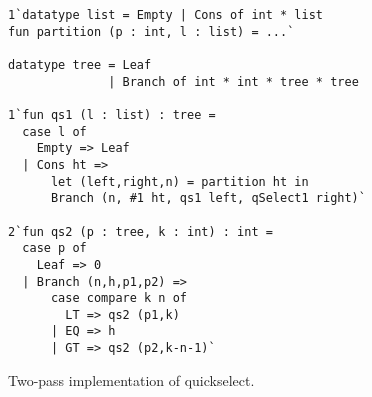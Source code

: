 \begin{figure}
\begin{lstlisting}
1`datatype list = Empty | Cons of int * list
fun partition (p : int, l : list) = ...`

datatype tree = Leaf
              | Branch of int * int * tree * tree

1`fun qs1 (l : list) : tree =
  case l of
    Empty => Leaf
  | Cons ht => 
      let (left,right,n) = partition ht in
      Branch (n, #1 ht, qs1 left, qSelect1 right)`

2`fun qs2 (p : tree, k : int) : int = 
  case p of
    Leaf => 0
  | Branch (n,h,p1,p2) => 
      case compare k n of
        LT => qs2 (p1,k)
      | EQ => h
      | GT => qs2 (p2,k-n-1)`
\end{lstlisting}
\caption{Two-pass implementation of quickselect.}
\label{fig:qs-split}
\end{figure}

